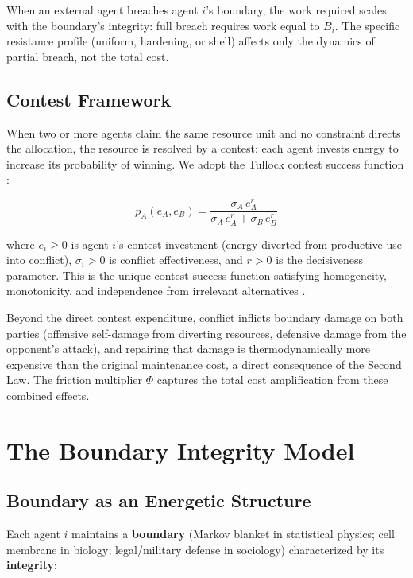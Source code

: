\documentclass[11pt]{article}
\theoremstyle{plain}
\theoremstyle{definition}
\theoremstyle{remark}
\let\origsection\section
\renewcommand{\section}{\needspace{12\baselineskip}\origsection}
\let\origsubsection\subsection
\renewcommand{\subsection}{\needspace{7\baselineskip}\origsubsection}
\begin{document}
When an external agent breaches agent \(i\)'s boundary, the work
required scales with the boundary's integrity: full breach requires work
equal to \(B_i\). The specific resistance profile (uniform, hardening,
or shell) affects only the dynamics of partial breach, not the total
cost.

\subsection{Contest Framework}\label{contest-framework}

When two or more agents claim the same resource unit and no constraint
directs the allocation, the resource is resolved by a contest: each
agent invests energy to increase its probability of winning. We adopt
the Tullock contest success function \citep{Tullock1980, Skaperdas1996}:

\[p_A(e_A, e_B) = \frac{\sigma_A \, e_A^r}{\sigma_A \, e_A^r + \sigma_B \, e_B^r}\]

where \(e_i \geq 0\) is agent \(i\)'s contest investment (energy
diverted from productive use into conflict), \(\sigma_i > 0\) is
conflict effectiveness, and \(r > 0\) is the decisiveness parameter.
This is the unique contest success function satisfying homogeneity,
monotonicity, and independence from irrelevant alternatives
\citep{Skaperdas1996}.

Beyond the direct contest expenditure, conflict inflicts boundary damage
on both parties (offensive self-damage from diverting resources,
defensive damage from the opponent's attack), and repairing that damage
is thermodynamically more expensive than the original maintenance cost,
a direct consequence of the Second Law. The friction multiplier \(\Phi\)
captures the total cost amplification from these combined effects.

\section{The Boundary Integrity
Model}\label{the-boundary-integrity-model}

\subsection{Boundary as an Energetic
Structure}\label{boundary-as-an-energetic-structure}

Each agent \(i\) maintains a \textbf{boundary} (Markov blanket in
statistical physics; cell membrane in biology; legal/military defense in
sociology) characterized by its \textbf{integrity}:
\end{document}
